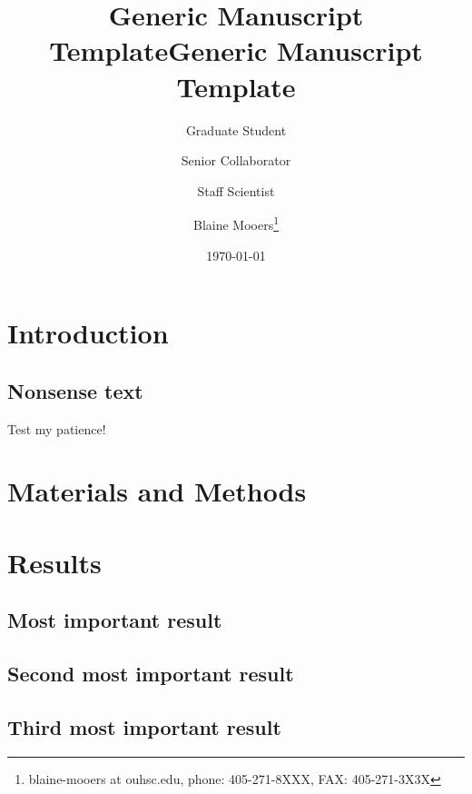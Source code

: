 \documentclass[11pt,letterpaper]{article}
\date{\today}
\title{Generic Manuscript Template}
\begin{document}
\author[1]{Graduate Student}
\author[2]{Senior Collaborator}
\author[3]{Staff Scientist}
\author[1,2,3]{Blaine Mooers\thanks{blaine-mooers at ouhsc.edu, phone: 405-271-8XXX, FAX: 405-271-3X3X}}
\title{Generic Manuscript Template}
\thispagestyle{plain}
\maketitle
{} %
\newpage
{}
\linenumbers


\section*{Introduction}
\label{sec:orgf69db3e}
\subsection*{Nonsense text}
\label{sec:orge9ef6cd}

Test my patience!

\lipsum[1-10]


\section*{Materials and Methods}
\label{sec:org34315d0}

\section*{Results}
\label{sec:org1d94492}
\subsection*{Most important result}
\label{sec:org9f7f54e}


\subsection*{Second most important result}
\label{sec:org19f090e}


\subsection*{Third most important result}
\label{sec:org9a29dcb}
\end{document}
